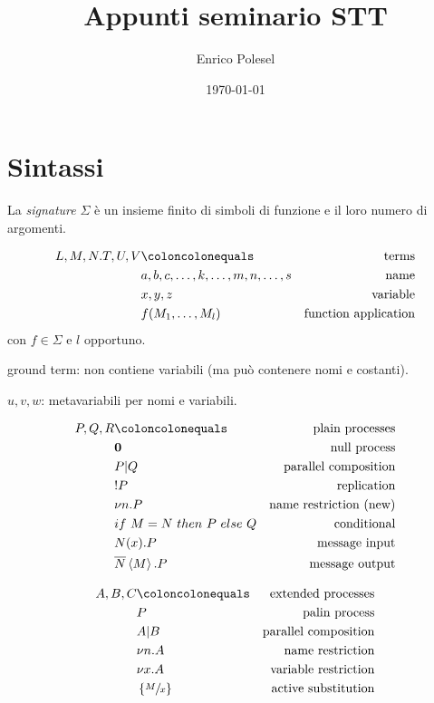 \documentclass[a4paper,12pt]{article}
\title{Appunti seminario STT}
\author{Enrico Polesel}
\date{\today}
\theoremstyle{plain}
\theoremstyle{definition}
\theoremstyle{remark}
\newcommand{\obar}[1]{\overline{#1}}
\begin{document}
\maketitle


\section{Sintassi}

La \textit{signature} $\Sigma$ \`e un insieme finito di simboli di
funzione e il loro numero di argomenti.

\begin{align*}
  L,M,N.T,U,V & \coloncolonequals & \text{terms} \\
  & a,b,c,\dots,k,\dots,m,n,\dots,s & \text{name} \\
  & x,y,z & \text{variable} \\
  & f(M_1,\dots,M_l) & \text{function application}
\end{align*}
con $f\in\Sigma$ e $l$ opportuno.

ground term: non contiene variabili (ma può contenere nomi e
costanti).

$u,v,w$: metavariabili per nomi e variabili.

\begin{align*}
  P,Q,R & \coloncolonequals & \text{plain processes} \\
  & \mathbf{0} & \text{null process} \\
  & P | Q & \text{parallel composition} \\
  & !P & \text{replication} \\
  & \nu n.P & \text{name restriction (new)} \\
  & if\ M=N\ then\ P\ else\ Q & \text{conditional} \\
  & N(x).P & \text{message input} \\
  & \obar{N}\left< M\right> .P & \text{message output}
\end{align*}

\begin{align*}
  A,B,C & \coloncolonequals & \text{extended processes} \\
  & P & \text{palin process} \\
  & A | B & \text{parallel composition} \\
  & \nu n.A & \text{name restriction} \\
  & \nu x.A & \text{variable restriction} \\
  & \left\{ \sfrac{M}{x} \right\} & \text{active substitution}
\end{align*}
\end{document}
